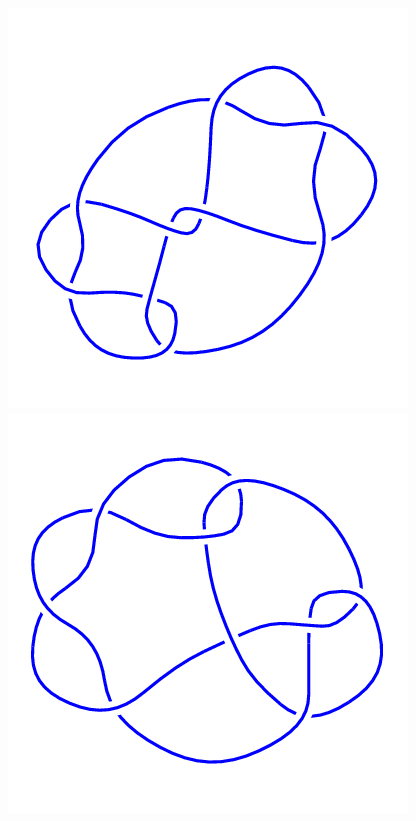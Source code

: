 \begin{figure}[H]
\begin{minipage}[b]{.18\linewidth}
	\end{minipage}
	\begin{minipage}[b]{.18\linewidth}
		\centering
		\includegraphics[width=\linewidth]{../data/9_18.png}
	\end{minipage}
	\begin{minipage}[b]{.18\linewidth}
		\centering
		\includegraphics[width=\linewidth]{../data/9_19.png}

\end{minipage}
\end{figure}
